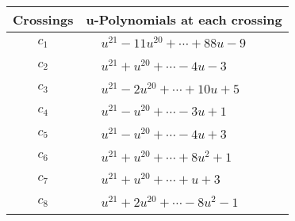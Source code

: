 \documentclass[1p]{elsarticle_modified}
\theoremstyle{definition}
\begin{document}
\begin{tabular}{m{50pt}|m{274pt}}
Crossings & \hspace{64pt}u-Polynomials at each crossing \\
\hline $$\begin{aligned}c_{1}\end{aligned}$$&$\begin{aligned}
&u^{21}-11 u^{20}+\cdots+88 u-9
\end{aligned}$\\
\hline $$\begin{aligned}c_{2}\end{aligned}$$&$\begin{aligned}
&u^{21}+u^{20}+\cdots-4 u-3
\end{aligned}$\\
\hline $$\begin{aligned}c_{3}\end{aligned}$$&$\begin{aligned}
&u^{21}-2 u^{20}+\cdots+10 u+5
\end{aligned}$\\
\hline $$\begin{aligned}c_{4}\end{aligned}$$&$\begin{aligned}
&u^{21}- u^{20}+\cdots-3 u+1
\end{aligned}$\\
\hline $$\begin{aligned}c_{5}\end{aligned}$$&$\begin{aligned}
&u^{21}- u^{20}+\cdots-4 u+3
\end{aligned}$\\
\hline $$\begin{aligned}c_{6}\end{aligned}$$&$\begin{aligned}
&u^{21}+u^{20}+\cdots+8 u^2+1
\end{aligned}$\\
\hline $$\begin{aligned}c_{7}\end{aligned}$$&$\begin{aligned}
&u^{21}+u^{20}+\cdots+u+3
\end{aligned}$\\
\hline $$\begin{aligned}c_{8}\end{aligned}$$&$\begin{aligned}
&u^{21}+2 u^{20}+\cdots-8 u^2-1
\end{aligned}$\\

\end{tabular}
\end{document}
